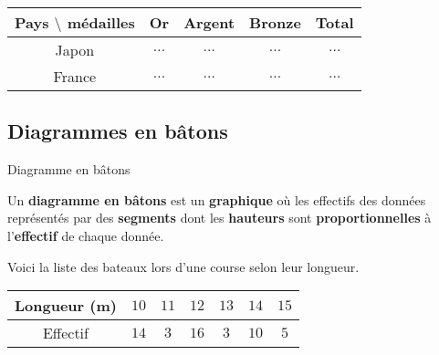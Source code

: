 \begin{pageAD}
 \begin{center}
 \begin{tabular}{|c|c|c|c|c|}\hline 
  Pays $\setminus$ médailles& Or & Argent & Bronze & Total\\\hline 
  Japon & $\ldots$ & $\ldots$ & $\ldots$ & $\ldots$ \\\hline
  France & $\ldots$ & $\ldots$ & $\ldots$& $\ldots$  \\\hline
 \end{tabular}
 \end{center}


\end{pageAD} 


\begin{pageCours} 
 
 
\section{Diagrammes en bâtons}

\begin{DefT}{Diagramme en bâtons}

Un \textbf{diagramme en bâtons} est un \textbf{graphique} où les effectifs des données représentés par des \textbf{segments} dont les \textbf{hauteurs} sont \textbf{proportionnelles} à l'\textbf{effectif} de chaque donnée.
\end{DefT}

\begin{Ex}

Voici la liste des bateaux lors d'une course selon leur longueur.
\begin{center}

\begin{tabular}{|c|c|c|c|c|c|c|}\hline
Longueur (m) & $10$ & $11$ & $12$ & $13$ & $14$ & $15$ \\\hline
Effectif & $14$ & $3$ & $16$ & $3$ & $10$ & $5$ \\\hline
\end{tabular}

\end{center}
\end{Ex}
\end{pageCours}
